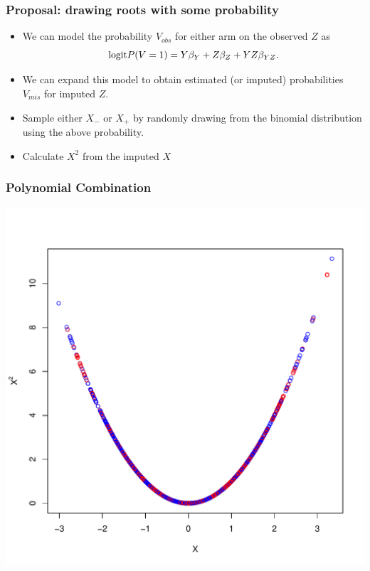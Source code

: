 \documentclass{beamer}
\begin{document}
\begin{frame}
  \frametitle{Proposal: drawing roots with some probability}
    \begin{itemize}
    \item We can model the probability $V_{obs}$ for either arm on the observed $Z$ as
    \begin{equation*}\label{PV}
\textnormal{logit}P(V=1)=Y\beta_Y + Z\beta_Z + YZ\beta_{YZ}.
\end{equation*}
\item We can expand this model to obtain estimated (or imputed) probabilities $V_{mis}$ for imputed $Z$.
\item Sample either $X_-$ or $X_+$ by randomly drawing from the binomial distribution using the above probability. 
\item Calculate $X^2$ from the imputed $X$
  \end{itemize}
 \end{frame}
 
\begin{frame}
  \frametitle{Polynomial Combination}
  \vspace{-.45 in} %
  \centering
\includegraphics[scale=.55]{polycomb.pdf}
 \end{frame}
 
\end{document}
